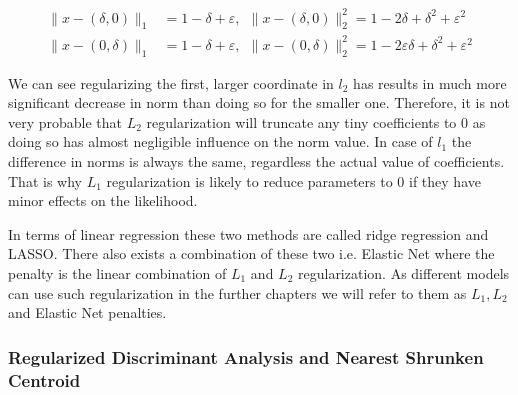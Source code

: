 \documentclass[12pt, wide]{mwart}
\begin{document}
\begin{align*}
    \|x-(\delta, 0)\|_{1}&=1-\delta+\varepsilon, \ \   \|x-(\delta, 0)\|_{2}^{2}=1-2 \delta+\delta^{2}+\varepsilon^{2} \\ 
    \|x-(0, \delta)\|_{1}&=1-\delta+\varepsilon, \ \  \|x-(0, \delta)\|_{2}^{2}=1-2 \varepsilon \delta+\delta^{2}+\varepsilon^{2}
\end{align*}

We can see regularizing the first, larger coordinate in $l_2$ has results in much more significant decrease in norm than doing so for the smaller one. Therefore, it is not very probable that $L_2$ regularization will truncate any tiny coefficients to $0$ as doing so has almost negligible influence on the norm value. In case of $l_1$ the difference in norms is always the same, regardless the actual value of coefficients. That is why $L_1$ regularization is likely to reduce parameters to $0$ if they have minor effects on the likelihood. 

In terms of linear regression these two methods are called ridge regression and LASSO. There also exists a combination of these two i.e. Elastic Net where the penalty is the linear combination of $L_1$ and $L_2$ regularization. As different models can use such regularization in the further chapters we will refer to them as $L_1, L_2$ and Elastic Net penalties.


\subsubsection{Regularized Discriminant Analysis and Nearest Shrunken Centroid}
\end{document}
